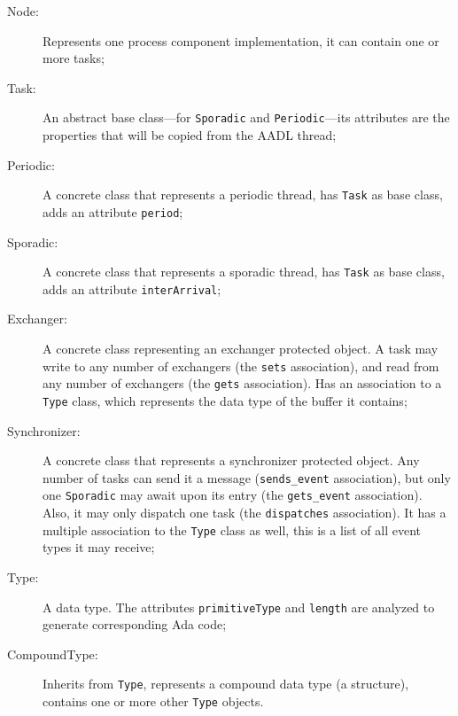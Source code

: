 \begin{description}
\item[Node:]{Represents one process component implementation, it can
  contain one or more tasks;}
\item[Task:]{An abstract base class---for \texttt{Sporadic} and
  \texttt{Periodic}---its attributes are the properties that will be
  copied from the AADL thread;}
\item[Periodic:]{A concrete class that represents a periodic thread,
  has \texttt{Task} as base class, adds an attribute \texttt{period};}
\item[Sporadic:]{A concrete class that represents a sporadic thread,
  has \texttt{Task} as base class, adds an attribute
  \texttt{interArrival};}
\item[Exchanger:]{A concrete class representing an exchanger protected
  object. A task may write to any number of exchangers (the
  \texttt{sets} association), and read from any number of exchangers
  (the \texttt{gets} association). Has an association to a
  \texttt{Type} class, which represents the data type of the buffer it
  contains;}
\item[Synchronizer:]{A concrete class that represents a synchronizer
  protected object. Any number of tasks can send it a message
  (\texttt{sends\_event} association), but only one \texttt{Sporadic}
  may await upon its entry (the \texttt{gets\_event}
  association). Also, it may only dispatch one task (the
  \texttt{dispatches} association). It has a multiple association to
  the \texttt{Type} class as well, this is a list of all event types
  it may receive;}
\item[Type:]{A data type. The attributes \texttt{primitiveType} and
  \texttt{length} are analyzed to generate corresponding Ada code;}
\item[CompoundType:]{Inherits from \texttt{Type}, represents a
  compound data type (a  structure), contains one or more
  other \texttt{Type} objects.}
\end{description}

